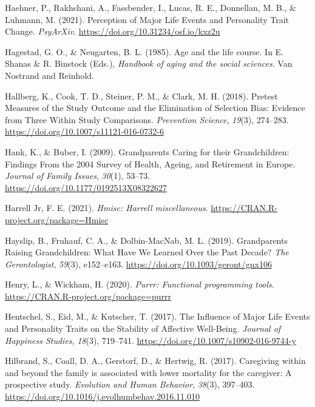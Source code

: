 \documentclass[
  english,
  man,floatsintext]{apa7}
\begin{document}
\leavevmode\hypertarget{ref-haehnerPerceptionMajorLife2021}{}%
Haehner, P., Rakhshani, A., Fassbender, I., Lucas, R. E., Donnellan, M. B., \& Luhmann, M. (2021). Perception of Major Life Events and Personality Trait Change. \emph{PsyArXiv}. \url{https://doi.org/10.31234/osf.io/kxz2u}

\leavevmode\hypertarget{ref-hagestadAgeLifeCourse1985}{}%
Hagestad, G. O., \& Neugarten, B. L. (1985). Age and the life course. In E. Shanas \& R. Binstock (Eds.), \emph{Handbook of aging and the social sciences}. Van Nostrand and Reinhold.

\leavevmode\hypertarget{ref-hallbergPretestMeasuresStudy2018}{}%
Hallberg, K., Cook, T. D., Steiner, P. M., \& Clark, M. H. (2018). Pretest Measures of the Study Outcome and the Elimination of Selection Bias: Evidence from Three Within Study Comparisons. \emph{Prevention Science}, \emph{19}(3), 274--283. \url{https://doi.org/10.1007/s11121-016-0732-6}

\leavevmode\hypertarget{ref-hankGrandparentsCaringTheir2009}{}%
Hank, K., \& Buber, I. (2009). Grandparents Caring for their Grandchildren: Findings From the 2004 Survey of Health, Ageing, and Retirement in Europe. \emph{Journal of Family Issues}, \emph{30}(1), 53--73. \url{https://doi.org/10.1177/0192513X08322627}

\leavevmode\hypertarget{ref-R-Hmisc}{}%
Harrell Jr, F. E. (2021). \emph{Hmisc: Harrell miscellaneous}. \url{https://CRAN.R-project.org/package=Hmisc}

\leavevmode\hypertarget{ref-hayslipGrandparentsRaisingGrandchildren2019}{}%
Hayslip, B., Fruhauf, C. A., \& Dolbin-MacNab, M. L. (2019). Grandparents Raising Grandchildren: What Have We Learned Over the Past Decade? \emph{The Gerontologist}, \emph{59}(3), e152--e163. \url{https://doi.org/10.1093/geront/gnx106}

\leavevmode\hypertarget{ref-R-purrr}{}%
Henry, L., \& Wickham, H. (2020). \emph{Purrr: Functional programming tools}. \url{https://CRAN.R-project.org/package=purrr}

\leavevmode\hypertarget{ref-hentschelInfluenceMajorLife2017}{}%
Hentschel, S., Eid, M., \& Kutscher, T. (2017). The Influence of Major Life Events and Personality Traits on the Stability of Affective Well-Being. \emph{Journal of Happiness Studies}, \emph{18}(3), 719--741. \url{https://doi.org/10.1007/s10902-016-9744-y}

\leavevmode\hypertarget{ref-hilbrandCaregivingFamilyAssociated2017}{}%
Hilbrand, S., Coall, D. A., Gerstorf, D., \& Hertwig, R. (2017). Caregiving within and beyond the family is associated with lower mortality for the caregiver: A prospective study. \emph{Evolution and Human Behavior}, \emph{38}(3), 397--403. \url{https://doi.org/10.1016/j.evolhumbehav.2016.11.010}
\end{document}
